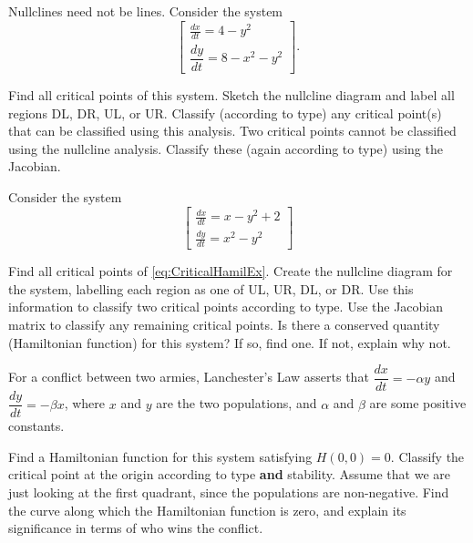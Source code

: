 \begin{exercise} Nullclines need not be lines. Consider the system
$$\begin{bmatrix} \displaystyle \frac{dx}{dt}=4-y^2\\ \dfrac{dy}{dt}=8-x^2-y^2 \end{bmatrix}.$$

\begin{tasks}
\task Find all critical points of this system.
\task Sketch the nullcline diagram and label all regions DL, DR, UL, or UR. Classify (according to type) any critical point(s) that can be classified using this analysis.
\task Two critical points cannot be classified using the nullcline analysis. Classify these (again according to type) using the Jacobian. 
\end{tasks}
\end{exercise}

\begin{exercise}
Consider the system
\begin{equation}
\begin{bmatrix}
\frac{dx}{dt}=x-y^2+2\\[12pt]
\frac{dy}{dt}=x^2-y^2
 \end{bmatrix}
\label{eq:CriticalHamilEx}
\end{equation}
\begin{tasks}
\task Find all critical points of \eqref{eq:CriticalHamilEx}.
\task Create the nullcline diagram for the system, labelling each region as one of UL, UR, DL, or DR. Use this information to classify two critical points according to type.
\task Use the Jacobian matrix to classify any remaining critical points.
\task Is there a conserved quantity (Hamiltonian function) for this system? If so, find one. If not, explain why not.
\end{tasks}
\end{exercise}

\begin{exercise}
 For a conflict between two armies, Lanchester's Law asserts that $\dfrac{dx}{dt}=-\alpha y$ and $\dfrac{dy}{dt}=-\beta x$, %
where $x$ and $y$ are the two populations, and $\alpha$ and $\beta$ are some positive constants.

\begin{tasks}
\task Find a Hamiltonian function for this system satisfying $H(0,0)=0$. 
\task Classify the critical point at the origin according to type {\bf and} stability.
\task Assume that we are just looking at the first quadrant, since the populations are non-negative. Find the curve along which the Hamiltonian function is zero, and explain its significance in terms of who wins the conflict.
\end{tasks}
\end{exercise}

